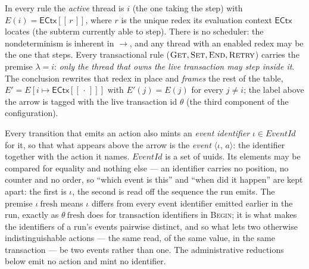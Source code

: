 \documentclass[manuscript,nonacm]{acmart}
\theoremstyle{acmdefinition}
\newcommand{\ectx}{\mathsf{ECtx}}
\newcommand{\ehole}[1]{\ectx[[\, #1 \,]]}
\newcommand{\eid}{\iota}
\newcommand{\ev}[2]{\langle #1,\, #2 \rangle}
\newcommand{\isfresh}{\ \text{fresh}}
\newcommand{\EventId}{\mathit{EventId}}
\begin{document}
In every rule the \emph{active} thread is $i$ (the one taking the step) with
$E(i)=\ehole{r}$, where $r$ is the unique redex its evaluation context $\ectx$
locates (the subterm currently able to step). There is no scheduler: the
nondeterminism is inherent in $\rightarrow$, and any thread with an enabled redex
may be the one that steps. Every transactional rule
($\textsc{Get},\textsc{Set},\textsc{End},\textsc{Retry}$) carries the premise
$\lambda = i$: \emph{only the thread that owns the live transaction may step inside
it}. The conclusion rewrites that redex in place and \emph{frames} the rest of the
table, $E' = E[i \mapsto \ehole{\cdot}]$ with $E'(j) = E(j)$ for every $j \neq i$;
the label above the arrow is tagged with the live transaction id $\theta$ (the third
component of the configuration).

Every transition that emits an action also mints an \emph{event identifier}
$\eid \in \EventId$ for it, so that what appears above the arrow is the
\emph{event} $\ev{\eid}{a}$: the identifier together with the action it names.
$\EventId$ is a set of uuids. Its elements may be compared for equality and
nothing else --- an identifier carries no position, no counter and no order, so
``which event is this'' and ``when did it happen'' are kept apart: the first is
$\eid$, the second is read off the sequence the run emits. The premise
$\eid\isfresh$ means $\eid$ differs from every event identifier emitted earlier
in the run, exactly as $\theta\isfresh$ does for transaction identifiers in
\textsc{Begin}; it is what makes the identifiers of a run's events pairwise
distinct, and so what lets two otherwise indistinguishable actions --- the same
read, of the same value, in the same transaction --- be two events rather than
one. The administrative reductions below emit no action and mint no identifier.
\end{document}
